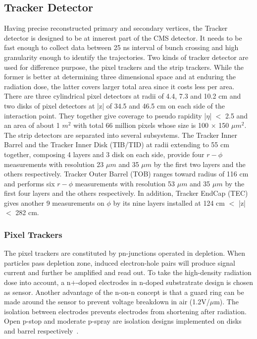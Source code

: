 \subsection{Tracker Detector} 
Having precise reconstructed primary and secondary vertices, the Tracker detector is designed to be at innerest part of the CMS detector.
It needs to be fast enough to collect data between 25 ns interval of bunch crossing and high granularity enough to identify the trajectories. 
Two kinds of tracker detector are used for difference purpose, the pixel trackers and the strip trackers. 
While the former is better at determining three dimensional space and at enduring the radiation dose, 
the latter covers larger total area since it costs less per area. 
There are three cylindrical pixel detectors at radii of 4.4, 7.3 and 10.2 cm and two disks of pixel detectors at |z| of 34.5 and 46.5 cm on each side of the interaction point. 
They together give coverage to pseudo rapidity |$\eta $| $<$ 2.5 and an area of about 1 $m^2$ with total 66 million pixels whose size is 100 $\times$ 150 $\mu m^2$. 
The strip detectors are separated into several subsystems. The Tracker Inner Barrel and the Tracker Inner Disk (TIB/TID) at radii extending to 55 cm together, composing 4 layers and 3 disk on each side, 
provide four $r-\phi $ measurements with resolution 23 $\mu m$ and 35 $\mu m$ by the first two layers and the others respectively. 
Tracker Outer Barrel (TOB) ranges toward radius of 116 cm and performs six $r-\phi $ measurements with resolution 53 $\mu m$ and 35 $\mu m$ by the first four layers and the others respectively.
In addition, Tracker EndCap (TEC) gives another 9 measurements on $\phi $ by its nine layers installed at 124 cm $<$ |z| $<$ 282 cm.
 
\subsubsection{Pixel Trackers}
The pixel trackers are constituted by pn-junctions operated in depletion. 
When particles pass depletion zone, induced electron-hole pairs will produce signal current and further be amplified and read out. 
To take the high-density radiation dose into account, a n$+$-doped electrodes in n-doped substratrate design is chosen as sensor. 
Another advantage of the n-on-n concept is that a guard ring can be made around the sensor to prevent voltage breakdown in air (1.2V/$\mu $m). 
The isolation between electrodes prevents electrodes from shortening after radiation. Open p-stop and moderate p-spray are isolation designs implemented on disks and barrel respectively~\citep{PixelD}.

